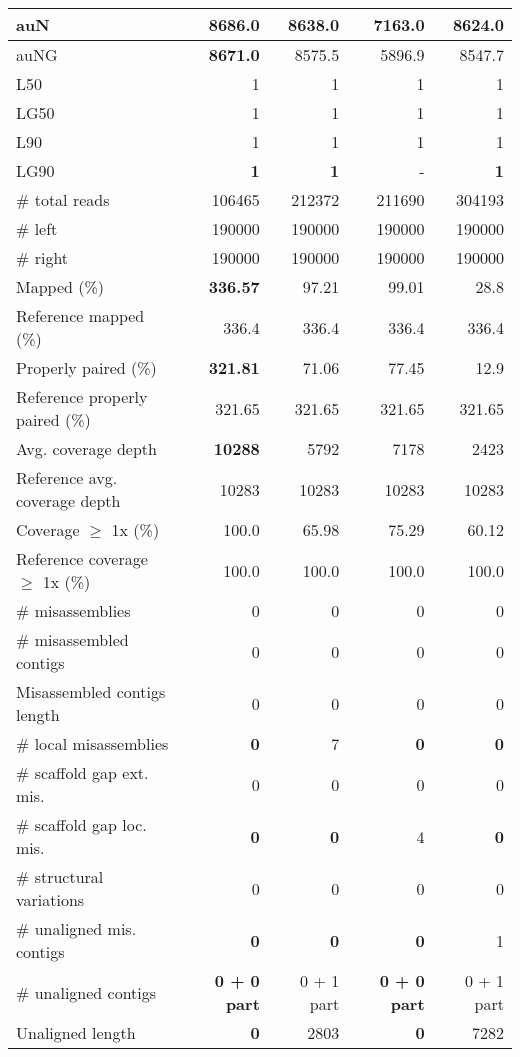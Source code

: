 \documentclass[12pt,a4paper]{article}
\begin{document}
\begin{table}[ht]
\begin{center}
\begin{tabular}{|l*{4}{|r}|}
auN & {\bf 8686.0} & 8638.0 & 7163.0 & 8624.0 \\ \hline
auNG & {\bf 8671.0} & 8575.5 & 5896.9 & 8547.7 \\ \hline
L50 & 1 & 1 & 1 & 1 \\ \hline
LG50 & 1 & 1 & 1 & 1 \\ \hline
L90 & 1 & 1 & 1 & 1 \\ \hline
LG90 & {\bf 1} & {\bf 1} & - & {\bf 1} \\ \hline
\# total reads & 106465 & 212372 & 211690 & 304193 \\ \hline
\# left & 190000 & 190000 & 190000 & 190000 \\ \hline
\# right & 190000 & 190000 & 190000 & 190000 \\ \hline
Mapped (\%) & {\bf 336.57} & 97.21 & 99.01 & 28.8 \\ \hline
Reference mapped (\%) & 336.4 & 336.4 & 336.4 & 336.4 \\ \hline
Properly paired (\%) & {\bf 321.81} & 71.06 & 77.45 & 12.9 \\ \hline
Reference properly paired (\%) & 321.65 & 321.65 & 321.65 & 321.65 \\ \hline
Avg. coverage depth & {\bf 10288} & 5792 & 7178 & 2423 \\ \hline
Reference avg. coverage depth & 10283 & 10283 & 10283 & 10283 \\ \hline
Coverage $\geq$ 1x (\%) & 100.0 & 65.98 & 75.29 & 60.12 \\ \hline
Reference coverage $\geq$ 1x (\%) & 100.0 & 100.0 & 100.0 & 100.0 \\ \hline
\# misassemblies & 0 & 0 & 0 & 0 \\ \hline
\# misassembled contigs & 0 & 0 & 0 & 0 \\ \hline
Misassembled contigs length & 0 & 0 & 0 & 0 \\ \hline
\# local misassemblies & {\bf 0} & 7 & {\bf 0} & {\bf 0} \\ \hline
\# scaffold gap ext. mis. & 0 & 0 & 0 & 0 \\ \hline
\# scaffold gap loc. mis. & {\bf 0} & {\bf 0} & 4 & {\bf 0} \\ \hline
\# structural variations & 0 & 0 & 0 & 0 \\ \hline
\# unaligned mis. contigs & {\bf 0} & {\bf 0} & {\bf 0} & 1 \\ \hline
\# unaligned contigs & {\bf 0 + 0 part} & 0 + 1 part & {\bf 0 + 0 part} & 0 + 1 part \\ \hline
Unaligned length & {\bf 0} & 2803 & {\bf 0} & 7282 \\ \hline

\end{tabular}
\end{center}
\end{table}
\end{document}

